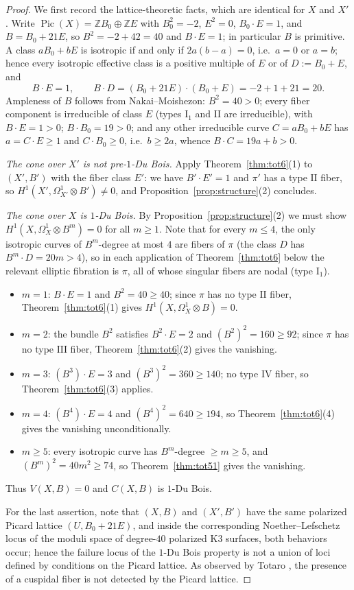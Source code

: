 \documentclass[11pt]{amsart}
\numberwithin{equation}{section}
\theoremstyle{plain}
\theoremstyle{definition}
\theoremstyle{remark}
\newcommand{\ZZ}{\mathbb{Z}}
\newcommand{\Pic}{\operatorname{Pic}}
\begin{document}
\begin{proof}
We first record the lattice-theoretic facts, which are identical for $X$ and $X'$.
Write $\Pic(X)=\ZZ B_0\oplus\ZZ E$ with $B_0^2=-2$, $E^2=0$, $B_0\cdot E=1$, and $B=B_0+21E$, so $B^2=-2+42=40$ and $B\cdot E=1$; in particular $B$ is primitive.
A class $aB_0+bE$ is isotropic if and only if $2a(b-a)=0$, i.e.\ $a=0$ or $a=b$; hence every isotropic effective class is a positive multiple of $E$ or of $D:=B_0+E$, and
\[
B\cdot E=1,\qquad B\cdot D=(B_0+21E)\cdot(B_0+E)=-2+1+21=20 .
\]
Ampleness of $B$ follows from Nakai--Moishezon: $B^2=40>0$; every fiber component is irreducible of class $E$ (types $\mathrm{I}_1$ and $\mathrm{II}$ are irreducible), with $B\cdot E=1>0$; $B\cdot B_0=19>0$; and any other irreducible curve $C=aB_0+bE$ has $a=C\cdot E\ge1$ and $C\cdot B_0\ge0$, i.e.\ $b\ge2a$, whence $B\cdot C=19a+b>0$.

\emph{The cone over $X'$ is not pre-$1$-Du Bois.}
Apply Theorem~\ref{thm:tot6}(1) to $(X',B')$ with the fiber class $E'$: we have $B'\cdot E'=1$ and $\pi'$ has a type $\mathrm{II}$ fiber, so $H^1(X',\Omega^1_{X'}\otimes B')\ne0$, and Proposition~\ref{prop:structure}(2) concludes.

\emph{The cone over $X$ is $1$-Du Bois.}
By Proposition~\ref{prop:structure}(2) we must show $H^1(X,\Omega^1_X\otimes B^m)=0$ for all $m\ge1$.
Note that for every $m\le4$, the only isotropic curves of $B^m$-degree at most $4$ are fibers of $\pi$ (the class $D$ has $B^m\cdot D=20m>4$), so in each application of Theorem~\ref{thm:tot6} below the relevant elliptic fibration is $\pi$, all of whose singular fibers are nodal (type $\mathrm{I}_1$).
\begin{itemize}
\item $m=1$: $B\cdot E=1$ and $B^2=40\ge40$; since $\pi$ has no type $\mathrm{II}$ fiber, Theorem~\ref{thm:tot6}(1) gives $H^1(X,\Omega^1_X\otimes B)=0$.
\item $m=2$: the bundle $B^{2}$ satisfies $B^{2}\cdot E=2$ and $(B^{2})^2=160\ge92$; since $\pi$ has no type $\mathrm{III}$ fiber, Theorem~\ref{thm:tot6}(2) gives the vanishing.
\item $m=3$: $(B^{3})\cdot E=3$ and $(B^3)^2=360\ge140$; no type $\mathrm{IV}$ fiber, so Theorem~\ref{thm:tot6}(3) applies.
\item $m=4$: $(B^{4})\cdot E=4$ and $(B^4)^2=640\ge194$, so Theorem~\ref{thm:tot6}(4) gives the vanishing unconditionally.
\item $m\ge5$: every isotropic curve has $B^m$-degree $\ge m\ge5$, and $(B^m)^2=40m^2\ge74$, so Theorem~\ref{thm:tot51} gives the vanishing.
\end{itemize}
Thus $V(X,B)=0$ and $C(X,B)$ is $1$-Du Bois.

For the last assertion, note that $(X,B)$ and $(X',B')$ have the same polarized Picard lattice $(U,B_0+21E)$, and inside the corresponding Noether--Lefschetz locus of the moduli space of degree-$40$ polarized K3 surfaces, both behaviors occur; hence the failure locus of the $1$-Du Bois property is not a union of loci defined by conditions on the Picard lattice.
As observed by Totaro \cite[\S6]{Tot}, the presence of a cuspidal fiber is not detected by the Picard lattice.
\end{proof}
\end{document}
